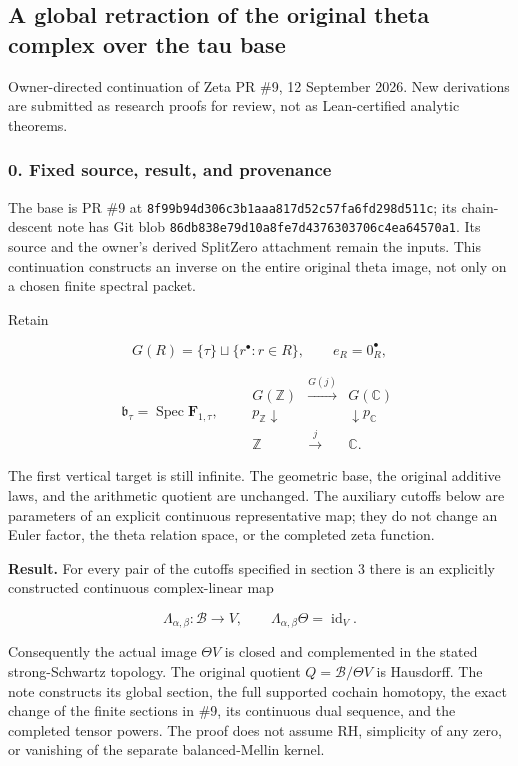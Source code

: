 \subsection{A global retraction of the original theta complex over the tau
base}\label{pr_10:a-global-retraction-of-the-original-theta-complex-over-the-tau-base}

Owner-directed continuation of Zeta PR \#9, 12 September 2026. New derivations are submitted as
research proofs for review, not as Lean-certified analytic theorems.

\subsubsection{0. Fixed source, result, and provenance}\label{pr_10:fixed-source-result-and-provenance}

The base is PR \#9 at \nolinkurl{8f99b94d306c3b1aaa817d52c57fa6fd298d511c}; its chain-descent note has
Git blob \nolinkurl{86db838e79d10a8fe7d4376303706c4ea64570a1}. Its source and the owner's derived
SplitZero attachment remain the inputs. This continuation constructs an inverse on the entire
original theta image, not only on a chosen finite spectral packet.

Retain

\[G(R)=\{\tau\}\sqcup\{r^\bullet:r\in R\},\qquad e_R=0_R^\bullet,\]

\[\mathfrak b_\tau=\operatorname{Spec}\mathbf F_{1,\tau},\qquad
\begin{array}{ccc}G(\mathbb Z)&\xrightarrow{G(j)}&G(\mathbb C)\\
p_{\mathbb Z}\downarrow&&\downarrow p_{\mathbb C}\\
\mathbb Z&\xrightarrow{j}&\mathbb C.\end{array}\tag{1}\]

The first vertical target is still infinite. The geometric base, the original additive laws, and the
arithmetic quotient are unchanged. The auxiliary cutoffs below are parameters of an explicit
continuous representative map; they do not change an Euler factor, the theta relation space, or the
completed zeta function.

\textbf{Result.} For every pair of the cutoffs specified in section 3 there is an explicitly
constructed continuous complex-linear map

\[\Lambda_{\alpha,\beta}:\mathscr B\longrightarrow V,\qquad
\boxed{\Lambda_{\alpha,\beta}\Theta=\operatorname{id}_V.}\tag{2}\]

Consequently the actual image \(\Theta V\) is closed and complemented in the stated strong-Schwartz
topology. The original quotient \(Q=\mathscr B/\Theta V\) is Hausdorff. The note constructs its
global section, the full supported cochain homotopy, the exact change of the finite sections in \#9,
its continuous dual sequence, and the completed tensor powers. The proof does not assume RH,
simplicity of any zero, or vanishing of the separate balanced-Mellin kernel.

